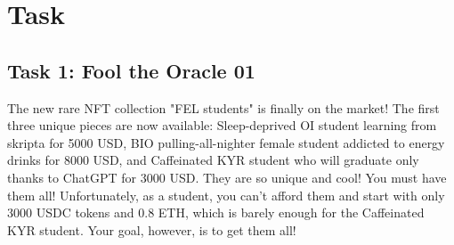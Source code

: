 \documentclass[12pt]{article}
\begin{document}
\section{Task}

\subsection*{Task 1: Fool the Oracle 01}

The new rare NFT collection "FEL students" is finally on the market! The first three unique pieces are now available: Sleep-deprived OI student learning from skripta for 5000 USD, BIO pulling-all-nighter female student addicted to energy drinks for 8000 USD, and Caffeinated KYR student who will graduate only thanks to ChatGPT for 3000 USD. They are so unique and cool! You must have them all! Unfortunately, as a student, you can't afford them and start with only 3000 USDC tokens and 0.8 ETH, which is barely enough for the Caffeinated KYR student. Your goal, however, is to get them all!
\end{document}
